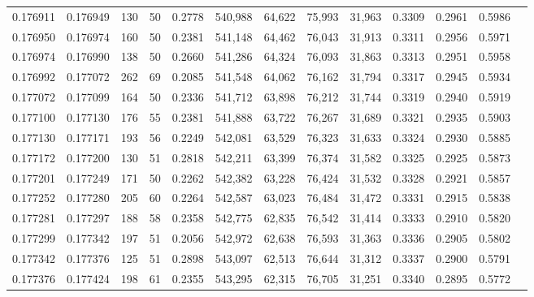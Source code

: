 \begin{tabular}{rrrrrrrrrrrrr}
0.176911 & 0.176949 &   130 &  50 &                                     0.2778 & 540,988 &  64,622 &  75,993 &  31,963 & 0.3309 & 0.2961 & 0.5986 \\
0.176950 & 0.176974 &   160 &  50 &                                     0.2381 & 541,148 &  64,462 &  76,043 &  31,913 & 0.3311 & 0.2956 & 0.5971 \\
0.176974 & 0.176990 &   138 &  50 &                                     0.2660 & 541,286 &  64,324 &  76,093 &  31,863 & 0.3313 & 0.2951 & 0.5958 \\
0.176992 & 0.177072 &   262 &  69 &                                     0.2085 & 541,548 &  64,062 &  76,162 &  31,794 & 0.3317 & 0.2945 & 0.5934 \\
0.177072 & 0.177099 &   164 &  50 &                                     0.2336 & 541,712 &  63,898 &  76,212 &  31,744 & 0.3319 & 0.2940 & 0.5919 \\
0.177100 & 0.177130 &   176 &  55 &                                     0.2381 & 541,888 &  63,722 &  76,267 &  31,689 & 0.3321 & 0.2935 & 0.5903 \\
0.177130 & 0.177171 &   193 &  56 &                                     0.2249 & 542,081 &  63,529 &  76,323 &  31,633 & 0.3324 & 0.2930 & 0.5885 \\
0.177172 & 0.177200 &   130 &  51 &                                     0.2818 & 542,211 &  63,399 &  76,374 &  31,582 & 0.3325 & 0.2925 & 0.5873 \\
0.177201 & 0.177249 &   171 &  50 &                                     0.2262 & 542,382 &  63,228 &  76,424 &  31,532 & 0.3328 & 0.2921 & 0.5857 \\
0.177252 & 0.177280 &   205 &  60 &                                     0.2264 & 542,587 &  63,023 &  76,484 &  31,472 & 0.3331 & 0.2915 & 0.5838 \\
0.177281 & 0.177297 &   188 &  58 &                                     0.2358 & 542,775 &  62,835 &  76,542 &  31,414 & 0.3333 & 0.2910 & 0.5820 \\
0.177299 & 0.177342 &   197 &  51 &                                     0.2056 & 542,972 &  62,638 &  76,593 &  31,363 & 0.3336 & 0.2905 & 0.5802 \\
0.177342 & 0.177376 &   125 &  51 &                                     0.2898 & 543,097 &  62,513 &  76,644 &  31,312 & 0.3337 & 0.2900 & 0.5791 \\
0.177376 & 0.177424 &   198 &  61 &                                     0.2355 & 543,295 &  62,315 &  76,705 &  31,251 & 0.3340 & 0.2895 & 0.5772 \\

\end{tabular}
